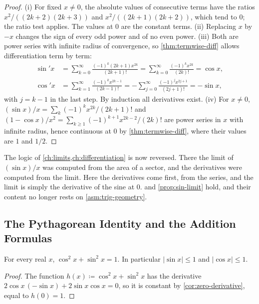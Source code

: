 \begin{proof}
(i) For fixed $x\ne0$, the absolute values of consecutive terms have the ratios $x^2/((2k+2)(2k+3))$ and $x^2/((2k+1)(2k+2))$, which tend to $0$; the ratio test applies. The values at $0$ are the constant terms. (ii) Replacing $x$ by $-x$ changes the sign of every odd power and of no even power. (iii) Both are power series with infinite radius of convergence, so \cref{thm:termwise-diff} allows differentiation term by term:
\begin{align*}
\sin'x&=\sum_{k=0}^\infty\frac{(-1)^k(2k+1)x^{2k}}{(2k+1)!}=\sum_{k=0}^\infty\frac{(-1)^kx^{2k}}{(2k)!}=\cos x,\\
\cos'x&=\sum_{k=1}^\infty\frac{(-1)^kx^{2k-1}}{(2k-1)!}=-\sum_{j=0}^\infty\frac{(-1)^jx^{2j+1}}{(2j+1)!}=-\sin x ,
\end{align*}
with $j=k-1$ in the last step. By induction all derivatives exist. (iv) For $x\ne0$, $(\sin x)/x=\sum_k(-1)^kx^{2k}/(2k+1)!$ and $(1-\cos x)/x^2=\sum_{k\ge1}(-1)^{k+1}x^{2k-2}/(2k)!$ are power series in $x$ with infinite radius, hence continuous at $0$ by \cref{thm:termwise-diff}, where their values are $1$ and $1/2$.
\end{proof}

The logic of \cref{ch:limits,ch:differentiation} is now reversed. There the limit of $(\sin x)/x$ was computed from the area of a sector, and the derivatives were computed from the limit. Here the derivatives come first, from the series, and the limit is simply the derivative of the sine at $0$.  and \cref{prop:sin-limit} hold, and their content no longer rests on \cref{asm:trig-geometry}.

\subsection{The Pythagorean Identity and the Addition Formulas}

\begin{theorem}
\label{thm:pythagorean}
For every real $x$, $\cos^2x+\sin^2x=1$. In particular $|\sin x|\le1$ and $|\cos x|\le1$.
\end{theorem}

\begin{proof}
The function $h(x)\coloneqq\cos^2x+\sin^2x$ has the derivative $2\cos x\,(-\sin x)+2\sin x\cos x=0$, so it is constant by \cref{cor:zero-derivative}, equal to $h(0)=1$.
\end{proof}

